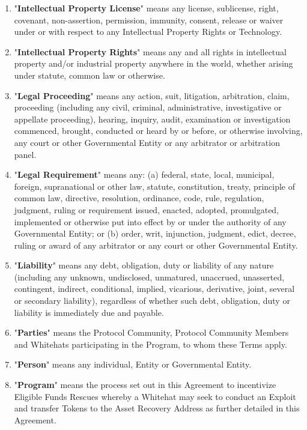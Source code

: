 \begin{enumerate}[label=\Alph*.]
    \item "\textbf{Intellectual Property License}" means any license, sublicense, right, covenant, non-assertion, permission, immunity, consent, release or waiver under or with respect to any Intellectual Property Rights or Technology.

    \item "\textbf{Intellectual Property Rights}" means any and all rights in intellectual property and/or industrial property anywhere in the world, whether arising under statute, common law or otherwise.

    \item "\textbf{Legal Proceeding}" means any action, suit, litigation, arbitration, claim, proceeding (including any civil, criminal, administrative, investigative or appellate proceeding), hearing, inquiry, audit, examination or investigation commenced, brought, conducted or heard by or before, or otherwise involving, any court or other Governmental Entity or any arbitrator or arbitration panel.

    \item "\textbf{Legal Requirement}" means any: (a) federal, state, local, municipal, foreign, supranational or other law, statute, constitution, treaty, principle of common law, directive, resolution, ordinance, code, rule, regulation, judgment, ruling or requirement issued, enacted, adopted, promulgated, implemented or otherwise put into effect by or under the authority of any Governmental Entity; or (b) order, writ, injunction, judgment, edict, decree, ruling or award of any arbitrator or any court or other Governmental Entity.

    \item "\textbf{Liability}" means any debt, obligation, duty or liability of any nature (including any unknown, undisclosed, unmatured, unaccrued, unasserted, contingent, indirect, conditional, implied, vicarious, derivative, joint, several or secondary liability), regardless of whether such debt, obligation, duty or liability is immediately due and payable.

    \item "\textbf{Parties}" means the Protocol Community, Protocol Community Members and Whitehats participating in the Program, to whom these Terms apply.

    \item "\textbf{Person}" means any individual, Entity or Governmental Entity.

    \item "\textbf{Program}" means the process set out in this Agreement to incentivize Eligible Funds Rescues whereby a Whitehat may seek to conduct an Exploit and transfer Tokens to the Asset Recovery Address as further detailed in this Agreement.


\end{enumerate}
